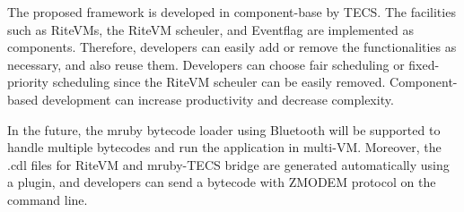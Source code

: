 \documentclass[submit]{ipsj_v2/UTF8/ipsj}
\begin{document}
The proposed framework is developed in component-base by TECS.
The facilities such as RiteVMs, the RiteVM scheuler, and Eventflag are implemented as components.
Therefore, developers can easily add or remove the functionalities as necessary, and also reuse them.
Developers can choose fair scheduling or fixed-priority scheduling since the RiteVM scheuler can be easily removed.
Component-based development can increase productivity and decrease complexity.

In the future, the mruby bytecode loader using Bluetooth will be supported to handle multiple bytecodes and run the application in multi-VM.
Moreover, the .cdl files for RiteVM and mruby-TECS bridge are generated automatically using a plugin, and developers can send a bytecode with ZMODEM protocol on the command line.





\begin{biography}
%
%
\end{biography}
\end{document}
